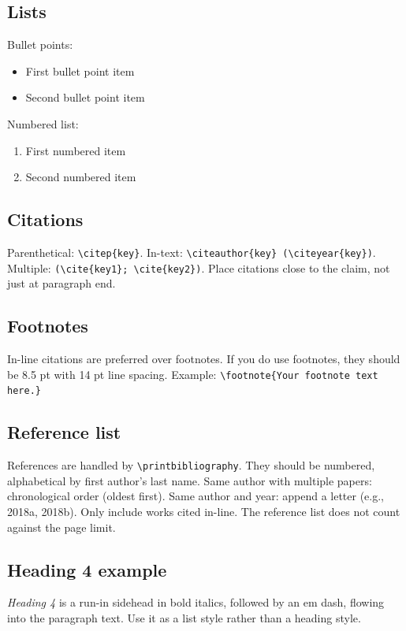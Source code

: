 \documentclass[
	letterpaper, %
]{jdf}
\begin{document}
\subsection*{Lists}

Bullet points:

\begin{itemize}
	\item First bullet point item
	\item Second bullet point item
\end{itemize}

Numbered list:

\begin{enumerate}
	\item First numbered item
	\item Second numbered item
\end{enumerate}

\subsection*{Citations}

Parenthetical: \verb|\citep{key}|. In-text: \verb|\citeauthor{key} (\citeyear{key})|. Multiple: \verb|(\cite{key1}; \cite{key2})|. Place citations close to the claim, not just at paragraph end.

\subsection*{Footnotes}

In-line citations are preferred over footnotes. If you do use footnotes, they should be 8.5 pt with 14 pt line spacing. Example: \verb|\footnote{Your footnote text here.}|

\subsection*{Reference list}

References are handled by \verb|\printbibliography|. They should be numbered, alphabetical by first author's last name. Same author with multiple papers: chronological order (oldest first). Same author and year: append a letter (e.g., 2018a, 2018b). Only include works cited in-line. The reference list does not count against the page limit.

\subsection*{Heading 4 example}

\emph{Heading 4} is a run-in sidehead in bold italics, followed by an em dash, flowing into the paragraph text. Use it as a list style rather than a heading style.
\end{document}
